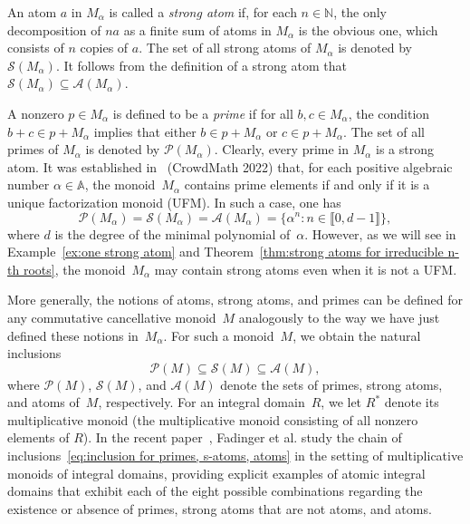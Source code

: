 \documentclass[11pt]{amsart}
\theoremstyle{definition}
\theoremstyle{remark}
\numberwithin{equation}{section}
\newcommand{\aaa}{\mathbb{A}}
\newcommand{\nn}{\mathbb{N}}
\providecommand\ldb{\llbracket}
\providecommand\rdb{\rrbracket}
\begin{document}
An atom $a$ in $M_\alpha$ is called a \emph{strong atom} if, for each $n \in \nn$, the only decomposition of $na$ as a finite sum of atoms in $M_\alpha$ is the obvious one, which consists of $n$ copies of $a$. The set of all strong atoms of $M_\alpha$ is denoted by $\mathcal{S}(M_\alpha)$. It follows from the definition of a strong atom that $\mathcal{S}(M_\alpha) \subseteq \mathcal{A}(M_\alpha)$.

\smallskip

A nonzero $p \in M_\alpha$ is defined to be a \emph{prime} if for all $b,c \in M_\alpha$, the condition $b+c \in p + M_\alpha$ implies that either $b \in p + M_\alpha$ or $c \in p + M_\alpha$. The set of all primes of $M_\alpha$ is denoted by $\mathcal{P}(M_\alpha)$. Clearly, every prime in $M_\alpha$ is a strong atom. It was established in~\cite{AGS25} (CrowdMath 2022) that, for each positive algebraic number $\alpha \in \aaa$, the monoid~$M_\alpha$ contains prime elements if and only if it is a unique factorization monoid (UFM). In such a case, one has
\[
    \mathcal{P}(M_\alpha) = \mathcal{S}(M_\alpha) = \mathcal{A}(M_\alpha) = \{\alpha^n : n \in \ldb 0, d-1\rdb \},
\]
where $d$ is the degree of the minimal polynomial of~$\alpha$. However, as we will see in Example~\ref{ex:one strong atom} and Theorem~\ref{thm:strong atoms for irreducible n-th roots}, the monoid~$M_\alpha$ may contain strong atoms even when it is not a UFM.

\smallskip

More generally, the notions of atoms, strong atoms, and primes can be defined for any commutative cancellative monoid~$M$ analogously to the way we have just defined these notions in~$M_\alpha$. For such a monoid~$M$, we obtain the natural inclusions
\begin{equation} \label{eq:inclusion for primes, s-atoms, atoms}
    \mathcal{P}(M) \subseteq \mathcal{S}(M) \subseteq \mathcal{A}(M),
\end{equation}
where $\mathcal{P}(M)$, $\mathcal{S}(M)$, and $\mathcal{A}(M)$ denote the sets of primes, strong atoms, and atoms of~$M$, respectively. For an integral domain~$R$, we let $R^*$ denote its multiplicative monoid (the multiplicative monoid consisting of all nonzero elements of $R$). In the recent paper~\cite{FFNSW24}, Fadinger et al. study the chain of inclusions~\eqref{eq:inclusion for primes, s-atoms, atoms} in the setting of multiplicative monoids of integral domains, providing explicit examples of atomic integral domains that exhibit each of the eight possible combinations regarding the existence or absence of primes, strong atoms that are not atoms, and atoms.
\end{document}
